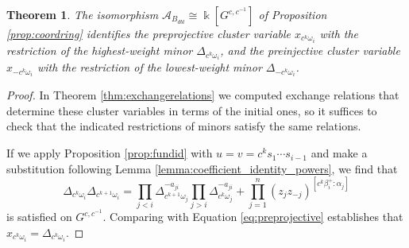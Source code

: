 \documentclass[12pt]{amsart}
\newcommand{\cA}{\mathcal{A}}
\newcommand{\kk}{\Bbbk}%
\newtheorem{theorem}{Theorem}[section]
\theoremstyle{remark}
\numberwithin{equation}{section}
\begin{document}
\begin{theorem}\label{thm:mainirregular}
The isomorphism $\cA_{B_{dbl}} \cong \kk[G^{c,c^{-1}}]$ of Proposition \ref{prop:coordring} identifies the preprojective cluster variable $x_{c^k\omega_i}$ with the restriction of the highest-weight minor $\Delta_{c^k\omega_i}$, and the preinjective cluster variable $x_{-c^k \omega_i}$ with the restriction of the lowest-weight minor $\Delta_{-c^k \omega_i}$. 
\end{theorem}

\begin{proof}
In Theorem \ref{thm:exchangerelations} we computed exchange relations that determine these cluster variables in terms of the initial ones, so it suffices to check that the indicated restrictions of minors satisfy the same relations.

If we apply Proposition \ref{prop:fundid} with $u = v = c^k s_1 \cdots s_{i-1}$ and make a substitution following Lemma \ref{lemma:coefficient_identity_powers}, we find that 
\begin{equation}
\Delta_{c^k\omega_i}\Delta_{c^{k+1}\omega_i} = 
    \prod_{j<i}\Delta_{c^{k+1}\omega_j}^{-a_{ji}}
    \prod_{j>i}\Delta_{c^k\omega_j}^{-a_{ji}}
    +
    \prod_{j=1}^n(z_j z_{-j})^{[c^k\beta_i^+:\alpha_j]}
\end{equation}
is satisfied on $G^{c,c^{-1}}$. 
Comparing with Equation \ref{eq:preprojective} establishes that $x_{c^k\omega_i} = \Delta_{c^k \omega_i}$.


\end{proof}
\end{document}
